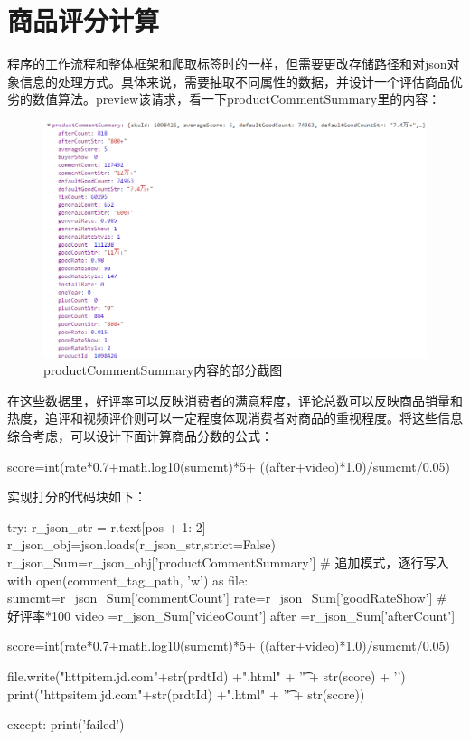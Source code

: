 \section{商品评分计算}
程序的工作流程和整体框架和爬取标签时的一样，但需要更改存储路径和对json对象信息的处理方式。具体来说，需要抽取不同属性的数据，并设计一个评估商品优劣的数值算法。preview该请求，看一下productCommentSummary里的内容：

\begin{figure}[htbp]
\centering
\includegraphics[width=13.5cm]{data eg jd.png}
\caption{productCommentSummary内容的部分截图}
\end{figure}

在这些数据里，好评率可以反映消费者的满意程度，评论总数可以反映商品销量和热度，追评和视频评价则可以一定程度体现消费者对商品的重视程度。将这些信息综合考虑，可以设计下面计算商品分数的公式：

\begin{python}
score=int(rate*0.7+math.log10(sumcmt)*5+
                          ((after+video)*1.0)/sumcmt/0.05)
\end{python}

实现打分的代码块如下：
\begin{python}
    try:
        r_json_str = r.text[pos + 1:-2]
        r_json_obj=json.loads(r_json_str,strict=False)
        r_json_Sum=r_json_obj['productCommentSummary']
        # 追加模式，逐行写入
        with open(comment_tag_path, 'w') as file:
            sumcmt=r_json_Sum['commentCount']
            rate=r_json_Sum['goodRateShow'] # 好评率*100
            video =r_json_Sum['videoCount']
            after =r_json_Sum['afterCount']

            score=int(rate*0.7+math.log10(sumcmt)*5+
                          ((after+video)*1.0)/sumcmt/0.05)


            file.write("httpitem.jd.com"+str(prdtId) +".html"
                       + '\t' + str(score) + '\n')
            print("httpsitem.jd.com"+str(prdtId) +".html"
                       + '\t' + str(score))

    except:
        print('failed')
\end{python}

